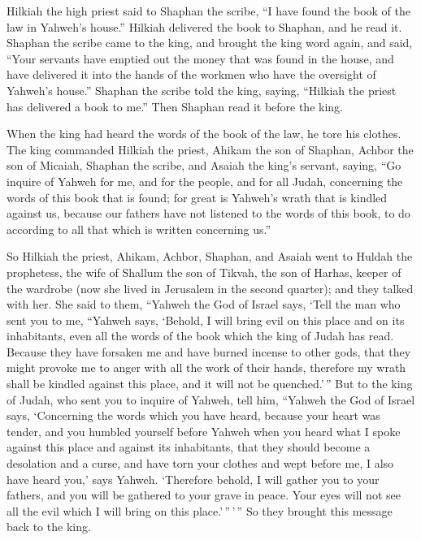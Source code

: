  Hilkiah the high priest said to Shaphan the scribe, ``I
have found the book of the law in Yahweh's house.'' Hilkiah delivered
the book to Shaphan, and he read it.  Shaphan the scribe
came to the king, and brought the king word again, and said, ``Your
servants have emptied out the money that was found in the house, and
have delivered it into the hands of the workmen who have the oversight
of Yahweh's house.''  Shaphan the scribe told the king,
saying, ``Hilkiah the priest has delivered a book to me.'' Then Shaphan
read it before the king.

 When the king had heard the words of the book of the law,
he tore his clothes.  The king commanded Hilkiah the
priest, Ahikam the son of Shaphan, Achbor the son of Micaiah, Shaphan
the scribe, and Asaiah the king's servant, saying,  ``Go
inquire of Yahweh for me, and for the people, and for all Judah,
concerning the words of this book that is found; for great is Yahweh's
wrath that is kindled against us, because our fathers have not listened
to the words of this book, to do according to all that which is written
concerning us.''

 So Hilkiah the priest, Ahikam, Achbor, Shaphan, and Asaiah
went to Huldah the prophetess, the wife of Shallum the son of Tikvah,
the son of Harhas, keeper of the wardrobe (now she lived in Jerusalem in
the second quarter); and they talked with her.  She said to
them, ``Yahweh the God of Israel says, `Tell the man who sent you to me,
 ``Yahweh says, `Behold, I will bring evil on this place
and on its inhabitants, even all the words of the book which the king of
Judah has read.  Because they have forsaken me and have
burned incense to other gods, that they might provoke me to anger with
all the work of their hands, therefore my wrath shall be kindled against
this place, and it will not be quenched.'\,''  But to the
king of Judah, who sent you to inquire of Yahweh, tell him, ``Yahweh the
God of Israel says, `Concerning the words which you have heard,
 because your heart was tender, and you humbled yourself
before Yahweh when you heard what I spoke against this place and against
its inhabitants, that they should become a desolation and a curse, and
have torn your clothes and wept before me, I also have heard you,' says
Yahweh.  `Therefore behold, I will gather you to your
fathers, and you will be gathered to your grave in peace. Your eyes will
not see all the evil which I will bring on this place.'\,''\,'\,'' So
they brought this message back to the king.

